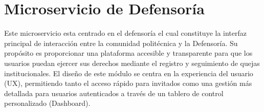 
\section{Microservicio de Defensoría}
\label{sec:modulo_defensoria}

Este microservicio esta centrado en el defensoría el cual constituye la interfaz principal de interacción entre la comunidad politécnica y la Defensoría. 
Su propósito es proporcionar una plataforma accesible y transparente para que los usuarios puedan ejercer sus derechos mediante el registro y seguimiento de quejas institucionales. El diseño de este módulo se centra en la experiencia del usuario (UX), permitiendo tanto el acceso rápido para invitados como una gestión más detallada para usuarios autenticados a través de un tablero de control personalizado (Dashboard).


%
%
%
%